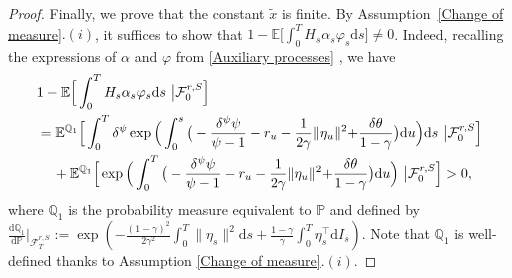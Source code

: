 \documentclass[12,reqno]{amsart}
\numberwithin{equation}{section}
\begin{document}
\begin{proof}
	Finally, we prove that the constant $\widetilde{x}$ is finite. By Assumption~\ref{Change of measure}$.(i)$, it suffices to show that $1-\mathbb{E}\big[\int_{0}^{T}H_{s}\alpha_{s}\varphi_{s}\mathrm{d}s\big]\ne0$. Indeed, recalling the expressions of $\alpha$ and $\varphi$ from \eqref{Auxiliary processes} , we have
	\begin{align}\label{E1_Proposition 3.2}
		&1-\mathbb{E}\Big[\int_{0}^{T}H_{s}\alpha_{s}\varphi_{s}\mathrm{d}s~\big|\mathcal{F}_{0}^{r,S}\Big]\notag\\
		&=\mathbb{E}^{\mathbb{Q}_{1}}\Big[\int_{0}^{T}\delta^{\psi}\exp\Big(\int_{0}^{s}\big(-\frac{\delta^{\psi}\psi}{\psi-1}-r_{u}-\frac{1}{2\gamma}\|\eta_{u}\|^{2}{+\frac{\delta\theta}{1-\gamma}}\big)\mathrm{d}u\Big)\mathrm{d}s~\big|\mathcal{F}_{0}^{r,S}\Big]\notag\\
		&\phantom{xx}+\mathbb{E}^{\mathbb{Q}_{1}}\Big[\exp\Big(\int_{0}^{T}\big(-\frac{\delta^{\psi}\psi}{\psi-1}-r_{u}-\frac{1}{2\gamma}\|\eta_{u}\|^{2}{+\frac{\delta\theta}{1-\gamma}}\big)\mathrm{d}u\Big)~\big|\mathcal{F}_{0}^{r,S}\Big]>0,
	\end{align}
	where $\mathbb{Q}_{1}$ is the probability measure equivalent to $\mathbb{P}$ and defined by\\ $\frac{\mathrm{d}\mathbb{Q}_{1}}{\mathrm{d}\mathbb{P}}\big|_{\mathcal{F}_{T}^{r,S}}:=\exp\left(-\frac{(1-\gamma)^{2}}{2\gamma^{2}}\int_{0}^{T}\|\eta_{s}\|^{2}\mathrm{d}s+\frac{1-\gamma}{\gamma}\int_{0}^{T}\eta_{s}^{\top}\mathrm{d}I_{s}\right)$. Note that $\mathbb{Q}_{1}$ is well-defined thanks to Assumption \ref{Change of measure}$.(i)$.
\end{proof}
\end{document}
